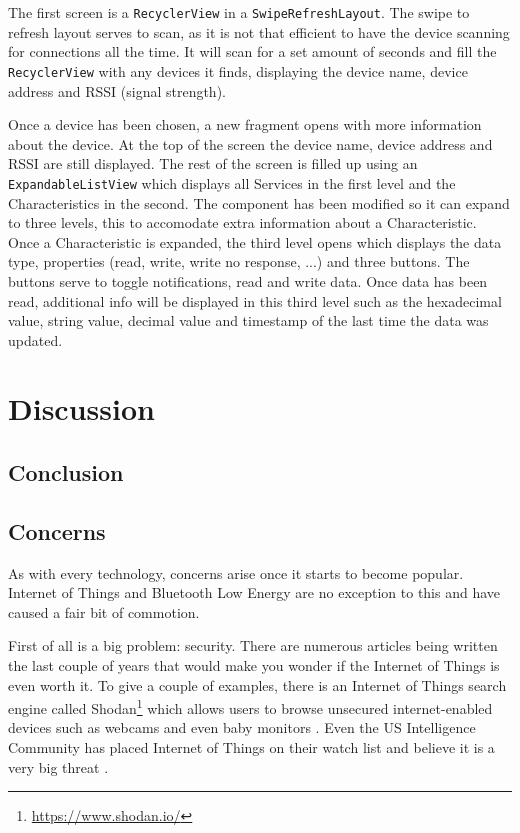 \documentclass[pdftex,a4paper,12pt,twoside]{report}
\begin{document}
The first screen is a \texttt{RecyclerView} in a \texttt{SwipeRefreshLayout}. The swipe to refresh layout serves to scan, as it is not that efficient to have the device scanning for connections all the time. It will scan for a set amount of seconds and fill the \texttt{RecyclerView} with any devices it finds, displaying the device name, device address and RSSI (signal strength).

Once a device has been chosen, a new fragment opens with more information about the device. At the top of the screen the device name, device address and RSSI are still displayed. The rest of the screen is filled up using an \texttt{ExpandableListView} which displays all Services in the first level and the Characteristics in the second. The component has been modified so it can expand to three levels, this to accomodate extra information about a Characteristic. Once a Characteristic is expanded, the third level opens which displays the data type, properties (read, write, write no response, ...) and three buttons. The buttons serve to toggle notifications, read and write data. Once data has been read, additional info will be displayed in this third level such as the hexadecimal value, string value, decimal value and timestamp of the last time the data was updated.

\chapter{Discussion}
\label{ch:discussion}

\section{Conclusion}
\label{sec:conclusion}

\section{Concerns}
\label{sec:concerns}

As with every technology, concerns arise once it starts to become popular. Internet of Things and Bluetooth Low Energy are no exception to this and have caused a fair bit of commotion.

First of all is a big problem: security. There are numerous articles being written the last couple of years that would make you wonder if the Internet of Things is even worth it. To give a couple of examples, there is an Internet of Things search engine called Shodan\footnote{\url{https://www.shodan.io/}} which allows users to browse unsecured internet-enabled devices such as webcams and even baby monitors \citep{porup20162, stanislav2015}. Even the US Intelligence Community has placed Internet of Things on their watch list and believe it is a very big threat \citep{clapper2016}.
\end{document}
